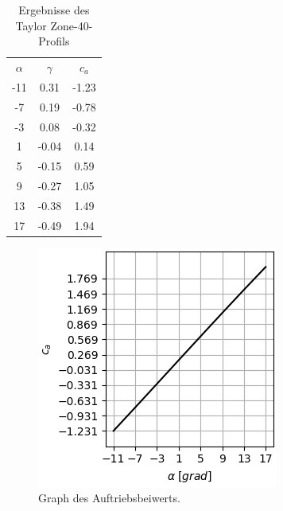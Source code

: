 \begin{minipage}{0.45\textwidth}
\begin{table}[H]
    \centering
    \begin{tabular}{c|cc}
    $\alpha$ & $\gamma$ & $c_a$ \\
        -11 & 0.31 & -1.23 \\ 
-7 & 0.19 & -0.78 \\ 
-3 & 0.08 & -0.32 \\ 
1 & -0.04 & 0.14 \\ 
5 & -0.15 & 0.59 \\ 
9 & -0.27 & 1.05 \\ 
13 & -0.38 & 1.49 \\ 
17 & -0.49 & 1.94 \\ 

    \end{tabular}
    \label{tab:zone}
    \caption{Ergebnisse des Taylor Zone-40-Profils}
\end{table}
\end{minipage}
\hfill
\begin{minipage}{0.45\textwidth}
\begin{figure}[H]
    \centering
    \includegraphics[scale=0.6]{figures/zoneca.png}
    \caption{Graph des Auftriebsbeiwerts.}
    \label{fig:zoneca}
\end{figure}
\end{minipage}

